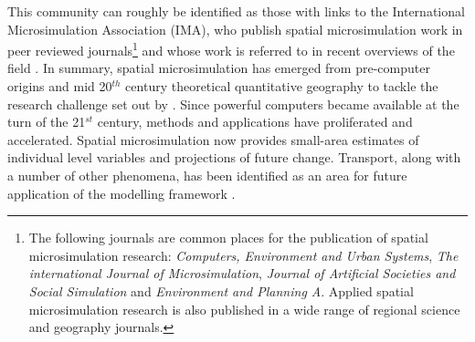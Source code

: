 This community can roughly be identified as those with links
to the International Microsimulation Association (IMA), 
who publish spatial microsimulation work in peer reviewed
journals\footnote{The following journals are common places for the
publication of spatial microsimulation research:
\emph{Computers, Environment and Urban Systems},
\emph{The international Journal of Microsimulation},
\emph{Journal of Artificial Societies and Social Simulation} and
\emph{Environment and Planning A}. Applied spatial microsimulation
research is also published in a wide range of regional science
and geography journals.
}
and whose work is referred to in recent overviews of the field
\citep{Tanton2013, O'Donoghue2013}.
In summary, spatial microsimulation has emerged
from pre-computer origins and mid 20$^{th}$ century theoretical quantitative
geography to tackle the research challenge set out by
\citet{Holm1987}. Since powerful computers became available at the turn
of the 21$^{st}$ century, methods and applications have
proliferated and accelerated. Spatial microsimulation now
provides small-area estimates
of individual level variables and projections of future change.
Transport, along with a number of other phenomena, has been
identified as an area for future application of the modelling framework
\citep{clarke2013conclusions}.
% 
